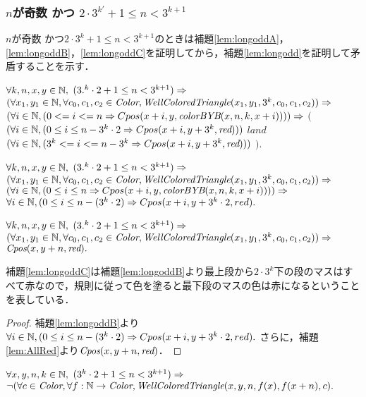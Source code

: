 \subsubsection{$n$が奇数 かつ $2 \cdot 3^{k'} + 1 \leq n < 3^{k+1}$}
$n$が奇数 かつ$2 \cdot 3^{k} + 1 \leq n < 3^{k+1}$のときは補題\ref{lem:longoddA}，\ref{lem:longoddB}，\ref{lem:longoddC}を証明してから，補題\ref{lem:longodd}を証明して矛盾することを示す．
\begin{lem}[\LongOddA] \label{lem:longoddA}
  $\forall k,n,x,y \in \mathbb{N},$
  $(3.^k\cdot2 + 1 \leq n < 3^{k+1}) \Rightarrow$
  $(\forall x_1,y_1 \in \mathbb{N}, \forall c_0,c_1,c_2 \in \textit{Color}, \textit{WellColoredTriangle}(x_1,y_1,3^k,c_0,c_1,c_2)) \Rightarrow$
  $(\forall i \in \mathbb{N},(0 <= i <= n \Rightarrow Cpos(x+i,y,\textit{colorBYB}(x,n,k,x+i)))) \Rightarrow$ 
      $($
        $(\forall i \in \mathbb{N},(0 \leq i \leq n - 3^k\cdot2 \Rightarrow Cpos(x+i,y+3^k,\textit{red})))$
        $land$
        $(\forall i \in \mathbb{N},(3^k <= i <= n - 3^k \Rightarrow Cpos(x+i,y+3^k,\textit{red})))$
      $)$.
\end{lem}
\begin{lem}[\LongOddB] \label{lem:longoddB}
  $\forall k,n,x,y \in \mathbb{N},$
  $(3.^k\cdot2 + 1 \leq n < 3^{k+1}) \Rightarrow$
  $(\forall x_1,y_1 \in \mathbb{N}, \forall c_0,c_1,c_2 \in \textit{Color}, \textit{WellColoredTriangle}(x_1,y_1,3^k,c_0,c_1,c_2)) \Rightarrow$
  $(\forall i \in \mathbb{N},(0 \leq i \leq n \Rightarrow Cpos(x+i,y,\textit{colorBYB}(x,n,k,x+i)))) \Rightarrow$ 
  $\forall i \in \mathbb{N}, (0 \leq i \leq n-(3^k\cdot2) \Rightarrow Cpos(x+i,y+3^k\cdot2,red).$
\end{lem}
\begin{lem}[\LongOddC] \label{lem:longoddC}
  $\forall k,n,x,y \in \mathbb{N},$
  $(3.^k\cdot2 + 1 \leq n < 3^{k+1}) \Rightarrow$
  $(\forall x_1,y_1 \in \mathbb{N}, \forall c_0,c_1,c_2 \in \textit{Color}, \textit{WellColoredTriangle}(x_1,y_1,3^k,c_0,c_1,c_2)) \Rightarrow$
  $\textit{Cpos}(x,y+n,\textit{red}).$
\end{lem}
補題\ref{lem:longoddC}は補題\ref{lem:longoddB}より最上段から$2\cdot3^k$下の段のマスはすべて赤なので，規則に従って色を塗ると最下段のマスの色は赤になるということを表している．
\begin{proof}
  補題\ref{lem:longoddB}より$\forall i \in \mathbb{N}, (0 \leq i \leq n-(3^k\cdot2) \Rightarrow Cpos(x+i,y+3^k\cdot2,red).$
  さらに，補題\ref{lem:AllRed}より$\textit{Cpos}(x,y+n,\textit{red})$．
\end{proof}
\begin{lem}[\LongOdd] \label{lem:longodd}
  $\forall x,y,n,k \in \mathbb{N},$
  $(3^k\cdot2 + 1 \leq n < 3^{k+1}) \Rightarrow$
  $\lnot(\forall c \in \textit{Color}, \forall f:\mathbb{N} \to \textit{Color}, \textit{WellColoredTriangle}(x,y,n,f(x),f(x+n), c).$
\end{lem}
